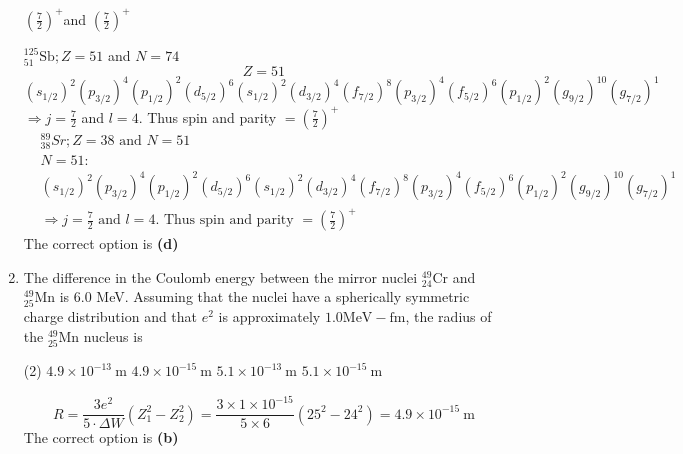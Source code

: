 \begin{enumerate}
\begin{tasks}
	\task[\textbf{D.}]$\left(\frac{7}{2}\right)^{+}$and $\left(\frac{7}{2}\right)^{+}$
\end{tasks}
\begin{answer}
	${ }_{51}^{125} \mathrm{Sb} ; Z=51$ and $N=74$
	$$
	Z=51
	$$
	$$
	\left(s_{1 / 2}\right)^{2}\left(p_{3 / 2}\right)^{4}\left(p_{1 / 2}\right)^{2}\left(d_{5 / 2}\right)^{6}\left(s_{1 / 2}\right)^{2}\left(d_{3 / 2}\right)^{4}\left(f_{7 / 2}\right)^{8}\left(p_{3 / 2}\right)^{4}\left(f_{5 / 2}\right)^{6}\left(p_{1 / 2}\right)^{2}\left(g_{9 / 2}\right)^{10}\left(g_{7 / 2}\right)^{1}
	$$
	$\Rightarrow j=\frac{7}{2}$ and $l=4$. Thus spin and parity $=\left(\frac{7}{2}\right)^{+}$\\
	\begin{align*}
		&{ }_{38}^{89} S r ; Z=38 \text { and } N=51 \\
		&N=51: \\
		&\left(s_{1 / 2}\right)^{2}\left(p_{3 / 2}\right)^{4}\left(p_{1 / 2}\right)^{2}\left(d_{5 / 2}\right)^{6}\left(s_{1 / 2}\right)^{2}\left(d_{3 / 2}\right)^{4}\left(f_{7 / 2}\right)^{8}\left(p_{3 / 2}\right)^{4}\left(f_{5 / 2}\right)^{6}\left(p_{1 / 2}\right)^{2}\left(g_{9 / 2}\right)^{10}\left(g_{7 / 2}\right)^{1} \\
		&\Rightarrow j=\frac{7}{2} \text { and } l=4 \text {. Thus spin and parity }=\left(\frac{7}{2}\right)^{+}
	\end{align*}
	The correct option is \textbf{(d)}
\end{answer}
	\item The difference in the Coulomb energy between the mirror nuclei ${ }_{24}^{49} \mathrm{Cr}$ and ${ }_{25}^{49} \mathrm{Mn}$ is 6.0 MeV. Assuming that the nuclei have a spherically symmetric charge distribution and that $e^{2}$ is approximately $1.0 \mathrm{MeV}-\mathrm{fm}$, the radius of the ${ }_{25}^{49} \mathrm{Mn}$ nucleus is
{}\\
\begin{tasks}(2)
	\task[\textbf{A.}] $4.9 \times 10^{-13} \mathrm{~m}$
	\task[\textbf{B.}]$4.9 \times 10^{-15} \mathrm{~m}$
	\task[\textbf{C.}]$5.1 \times 10^{-13} \mathrm{~m}$
	\task[\textbf{D.}]$5.1 \times 10^{-15} \mathrm{~m}$
\end{tasks}
\begin{answer}
	$$
	R=\frac{3 e^{2}}{5 \cdot \Delta W}\left(Z_{1}^{2}-Z_{2}^{2}\right)=\frac{3 \times 1 \times 10^{-15}}{5 \times 6}\left(25^{2}-24^{2}\right)=4.9 \times 10^{-15} \mathrm{~m}
	$$
	The correct option is \textbf{(b)}
\end{answer}

\end{enumerate}
